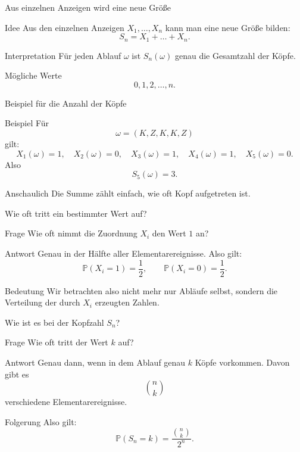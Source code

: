 \documentclass{beamer}
\begin{document}
\begin{frame}{Aus einzelnen Anzeigen wird eine neue Größe}
\begin{block}{Idee}
Aus den einzelnen Anzeigen \(X_1,\dots,X_n\) kann man eine neue Größe bilden:
\[
S_n=X_1+\dots+X_n.
\]
\end{block}

\begin{block}{Interpretation}
Für jeden Ablauf \(\omega\) ist \(S_n(\omega)\) genau die Gesamtzahl der Köpfe.
\end{block}

\begin{block}{Mögliche Werte}
\[
0,1,2,\dots,n.
\]
\end{block}
\end{frame}

\begin{frame}{Beispiel für die Anzahl der Köpfe}
\begin{block}{Beispiel}
Für
\[
\omega=(K,Z,K,K,Z)
\]
gilt:
\[
X_1(\omega)=1,\quad X_2(\omega)=0,\quad X_3(\omega)=1,\quad X_4(\omega)=1,\quad X_5(\omega)=0.
\]
Also
\[
S_5(\omega)=3.
\]
\end{block}

\begin{block}{Anschaulich}
Die Summe zählt einfach, wie oft Kopf aufgetreten ist.
\end{block}
\end{frame}

\begin{frame}{Wie oft tritt ein bestimmter Wert auf?}
\begin{block}{Frage}
Wie oft nimmt die Zuordnung \(X_i\) den Wert \(1\) an?
\end{block}

\begin{block}{Antwort}
Genau in der Hälfte aller Elementarereignisse.
Also gilt:
\[
\mathbb P(X_i=1)=\frac12,\qquad \mathbb P(X_i=0)=\frac12.
\]
\end{block}

\begin{block}{Bedeutung}
Wir betrachten also nicht mehr nur Abläufe selbst, sondern die Verteilung
der durch \(X_i\) erzeugten Zahlen.
\end{block}
\end{frame}

\begin{frame}{Wie ist es bei der Kopfzahl \(S_n\)?}
\begin{block}{Frage}
Wie oft tritt der Wert \(k\) auf?
\end{block}

\begin{block}{Antwort}
Genau dann, wenn in dem Ablauf genau \(k\) Köpfe vorkommen.
Davon gibt es
\[
\binom{n}{k}
\]
verschiedene Elementarereignisse.
\end{block}

\begin{block}{Folgerung}
Also gilt:
\[
\mathbb P(S_n=k)=\frac{\binom{n}{k}}{2^n}.
\]
\end{block}
\end{frame}
\end{document}
